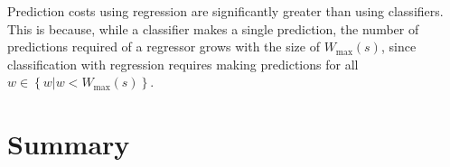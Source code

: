 Prediction costs using regression are significantly greater than using
classifiers. This is because, while a classifier makes a single
prediction, the number of predictions required of a regressor grows
with the size of $W_{\max}(s)$, since classification with regression
requires making predictions for all
$w \in \left\{ w | w < W_{\max}(s) \right\}$.


\section{Summary}

% 

% 
